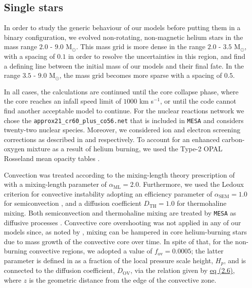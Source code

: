 \documentclass[../../main/thesis_msc.tex]{subfiles}
\begin{document}
    				\subsection{Single stars}
    				
    					In order to study the generic behaviour of our models before putting them in a binary configuration, we evolved non-rotating, non-magnetic helium stars in the mass range $2.0$ - $9.0$ M$_{\odot}$. This mass grid is more dense in the range $2.0$ - $3.5$ M$_{\odot}$, with a spacing of $0.1$ in order to resolve the uncertainties in this region, and find a defining line between the initial mass of our models and their final fate. In the range $3.5$ - $9.0$ M$_{\odot}$, the mass grid becomes more sparse with a spacing of $0.5$.
    					
    					In all cases, the calculations are continued until the core collapse phase, where the core reaches an infall speed limit of $1000$ km s$^{-1}$, or until the code cannot find another acceptable model to continue. For the nuclear reactions network we chose the \texttt{approx21\_cr60\_plus\_co56.net} that is included in \texttt{MESA} and considers twenty-two nuclear species. Moreover, we considered ion and electron screening corrections as described in \cite{PCR2009} and \cite{Itoh2002} respectively. To account for an enhanced carbon-oxygen mixture as a result of helium burning, we used the Type-2 OPAL Rosseland mean opacity tables \citep{OPAL}.
    					
    					Convection was treated according to the mixing-length theory prescription of \cite{MLT_Henyey} with a mixing-length parameter of $\alpha_{\text{ML}} = 2.0$. Furthermore, we used the Ledoux criterion for convective instability adopting an efficiency parameter of $\alpha_{\text{SEM}} = 1.0$ for semiconvection \citep{Langer1991}, and a diffusion coefficient $D_{\text{TH}} = 1.0$ for thermohaline mixing. Both semiconvection and thermohaline mixing are treated by \texttt{MESA} as diffusive processes \citep{Langer1983, Kipp_thermohaline}. Convective core overshooting was not applied in any of our models since, as noted by \cite{Tauris_ultra}, mixing can be hampered in core helium-burning stars due to mass growth of the convective core over time. In spite of that, for the non-burning convective regions, we adopted a value of $f_{\text{ov}} = 0.0005$; the latter parameter is defined in \cite{Herwig2000} as a fraction of the local pressure scale height, $H_p$, and is connected to the diffusion coefficient, $D_{\text{OV}}$, via the relation given by \hyperref[eq:OV_diff]{eq (2.6)}, where $z$ is the geometric distance from the edge of the convective zone.
    					
\end{document}
